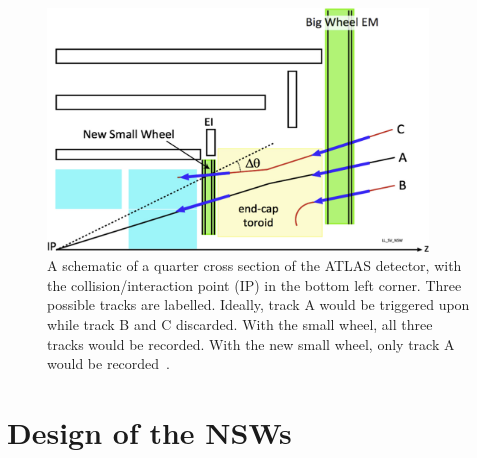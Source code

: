 
\begin{figure}
    \centering
    \includegraphics[width = 0.9\textwidth]{figures/perez-codina_NSW_tracks.jpg}
    \caption{A schematic of a quarter cross section of the ATLAS detector, with the collision/interaction point (IP) in the bottom left corner. Three possible tracks are labelled. Ideally, track A would be triggered upon while track B and C discarded. With the small wheel, all three tracks would be recorded. With the new small wheel, only track A would be recorded~\cite{nsw_tdr}.}
    \label{fig:nsw_track_triggering}
\end{figure}

\section{Design of the NSWs}

